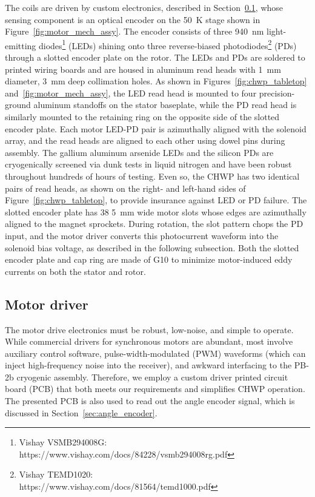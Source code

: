 The coils are driven by custom electronics, described in Section~\ref{sec:driver}, whose sensing component is an optical encoder on the 50~K stage shown in Figure~\ref{fig:motor_mech_assy}. The encoder consists of three 940~nm light-emitting diodes\footnote{Vishay VSMB294008G: \\ https://www.vishay.com/docs/84228/vsmb294008rg.pdf} (LEDs) shining onto three reverse-biased photodiodes\footnote{Vishay TEMD1020: \\ https://www.vishay.com/docs/81564/temd1000.pdf} (PDs) through a slotted encoder plate on the rotor. The LEDs and PDs are soldered to printed wiring boards and are housed in aluminum read heads with 1~mm diameter, 3~mm deep collimation holes. As shown in Figures~\ref{fig:chwp_tabletop} and~\ref{fig:motor_mech_assy}, the LED read head is mounted to four precision-ground aluminum standoffs on the stator baseplate, while the PD read head is similarly mounted to the retaining ring on the opposite side of the slotted encoder plate. Each motor LED-PD pair is azimuthally aligned with the solenoid array, and the read heads are aligned to each other using dowel pins during assembly. The gallium aluminum arsenide LEDs and the silicon PDs are cryogenically screened via dunk tests in liquid nitrogen and have been robust throughout hundreds of hours of testing. Even so, the CHWP has two identical pairs of read heads, as shown on the right- and left-hand sides of Figure~\ref{fig:chwp_tabletop}, to provide insurance against LED or PD failure. The slotted encoder plate has 38 5~mm wide motor slots whose edges are azimuthally aligned to the magnet sprockets. During rotation, the slot pattern chops the PD input, and the motor driver converts this photocurrent waveform into the solenoid bias voltage, as described in the following subsection. Both the slotted encoder plate and cap ring are made of G10 to minimize motor-induced eddy currents on both the stator and rotor.


\subsection{Motor driver}
\label{sec:driver}

The motor drive electronics must be robust, low-noise, and simple to operate. While commercial drivers for synchronous motors are abundant, most involve auxiliary control software, pulse-width-modulated (PWM) waveforms (which can inject high-frequency noise into the receiver), and awkward interfacing to the PB-2b cryogenic assembly. Therefore, we employ a custom driver printed circuit board (PCB) that both meets our requirements and simplifies CHWP operation. The presented PCB is also used to read out the angle encoder signal, which is discussed in Section~\ref{sec:angle_encoder}.


